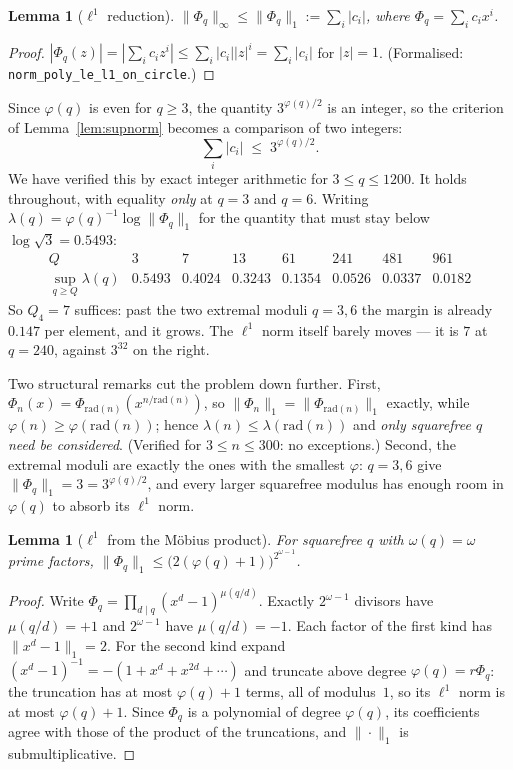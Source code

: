 \documentclass[11pt,a4paper]{article}
\theoremstyle{plain}
\newtheorem{lemma}[theorem]{Lemma}
\theoremstyle{definition}
\theoremstyle{remark}
\begin{document}
\begin{lemma}[$\ell^{1}$ reduction]\label{lem:l1}
$\|\Phi_q\|_{\infty}\le\|\Phi_q\|_{1}:=\sum_i|c_i|$, where $\Phi_q=\sum_ic_ix^i$.
\end{lemma}

\begin{proof}
$|\Phi_q(z)|=|\sum_ic_iz^{i}|\le\sum_i|c_i||z|^{i}=\sum_i|c_i|$ for $|z|=1$.
(Formalised: \texttt{norm\_poly\_le\_l1\_on\_circle}.)
\end{proof}

\noindent
Since $\varphi(q)$ is even for $q\ge3$, the quantity $3^{\varphi(q)/2}$ is an
integer, so the criterion of Lemma~\ref{lem:supnorm} becomes a comparison of two
integers:
\[
  \sum_i|c_i|\;\le\;3^{\varphi(q)/2}.
\]
We have verified this by exact integer arithmetic for $3\le q\le1200$. It holds
throughout, with equality \emph{only} at $q=3$ and $q=6$. Writing
$\lambda(q)=\varphi(q)^{-1}\log\|\Phi_q\|_1$ for the quantity that must stay
below $\log\sqrt3=0.5493$:
\[
  \begin{array}{l|ccccccc}
    Q & 3 & 7 & 13 & 61 & 241 & 481 & 961\\\hline
    \sup_{q\ge Q}\lambda(q) & 0.5493 & 0.4024 & 0.3243 & 0.1354 & 0.0526
      & 0.0337 & 0.0182
  \end{array}
\]
So $Q_4=7$ suffices: past the two extremal moduli $q=3,6$ the margin is already
$0.147$ per element, and it grows. The $\ell^{1}$ norm itself barely moves ---
it is $7$ at $q=240$, against $3^{32}$ on the right.

Two structural remarks cut the problem down further. First,
$\Phi_n(x)=\Phi_{\mathrm{rad}(n)}(x^{n/\mathrm{rad}(n)})$, so
$\|\Phi_n\|_1=\|\Phi_{\mathrm{rad}(n)}\|_1$ exactly, while
$\varphi(n)\ge\varphi(\mathrm{rad}(n))$; hence
$\lambda(n)\le\lambda(\mathrm{rad}(n))$ and \emph{only squarefree $q$ need be
considered}. (Verified for $3\le n\le300$: no exceptions.) Second, the
extremal moduli are exactly the ones with the smallest $\varphi$: $q=3,6$ give
$\|\Phi_q\|_1=3=3^{\varphi(q)/2}$, and every larger squarefree modulus has
enough room in $\varphi(q)$ to absorb its $\ell^{1}$ norm.

\begin{lemma}[$\ell^{1}$ from the M\"obius product]\label{lem:l1geom}
For squarefree $q$ with $\omega(q)=\omega$ prime factors,
$\|\Phi_q\|_1\le\bigl(2(\varphi(q)+1)\bigr)^{2^{\omega-1}}$.
\end{lemma}

\begin{proof}
Write $\Phi_q=\prod_{d\mid q}(x^{d}-1)^{\mu(q/d)}$. Exactly $2^{\omega-1}$
divisors have $\mu(q/d)=+1$ and $2^{\omega-1}$ have $\mu(q/d)=-1$. Each factor
of the first kind has $\|x^{d}-1\|_1=2$. For the second kind expand
$(x^{d}-1)^{-1}=-(1+x^{d}+x^{2d}+\cdots)$ and truncate above degree
$\varphi(q)=r\Phi_q$: the truncation has at most $\varphi(q)+1$ terms, all of
modulus~$1$, so its $\ell^{1}$ norm is at most $\varphi(q)+1$. Since
$\Phi_q$ is a polynomial of degree $\varphi(q)$, its coefficients agree with
those of the product of the truncations, and $\|\cdot\|_1$ is submultiplicative.
\end{proof}
\end{document}
